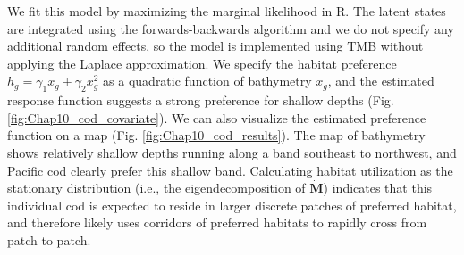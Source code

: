 We fit this model by maximizing the marginal likelihood in R.  The latent states are integrated using the forwards-backwards algorithm and we do not specify any additional random effects, so the model is implemented using TMB without applying the Laplace approximation.  We specify the habitat preference \( h_g  = \gamma_1 x_g + \gamma_2 x_g^2 \) as a quadratic function of bathymetry \(x_g\), and the estimated response function suggests a strong preference for shallow depths (Fig. \ref{fig:Chap10_cod_covariate}).  We can also visualize the estimated preference function on a map (Fig. \ref{fig:Chap10_cod_results}).  The map of bathymetry shows relatively shallow depths running along a band southeast to northwest, and Pacific cod clearly prefer this shallow band.  Calculating habitat utilization as the stationary distribution (i.e., the eigendecomposition of \(\dot{\mathbf{M}}\)) indicates that this individual cod is expected to reside in larger discrete patches of preferred habitat, and therefore likely uses corridors of preferred habitats to rapidly cross from patch to patch.     

